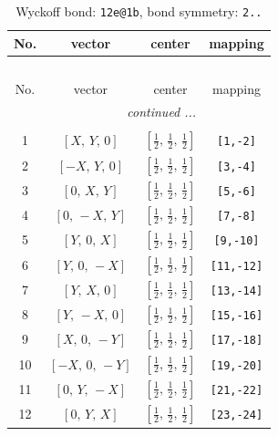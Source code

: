\documentclass[fleqn,8pt]{jsarticle}
\begin{document}
\renewcommand{\arraystretch}{1.2}
\begin{longtable}{cccc}
\caption{Wyckoff bond: {\tt 12e@1b}, bond symmetry: {\tt 2..}}
 \\
 \hline \hline
No. & vector & center & mapping \\ \hline \endfirsthead

\multicolumn{3}{l}{\tablename\ \thetable{}} \\
 \hline \hline
No. & vector & center & mapping \\ \hline \endhead

 \hline \hline
\multicolumn{3}{r}{\footnotesize\it continued ...} \\ \endfoot

 \hline \hline
\multicolumn{3}{r}{} \\ \endlastfoot

1 & $\left[ X,\, Y,\, 0 \right]$ & $\left[ \frac{1}{2},\, \frac{1}{2},\, \frac{1}{2} \right]$ & {\tt [1,-2]} \\ \hline
2 & $\left[ - X,\, Y,\, 0 \right]$ & $\left[ \frac{1}{2},\, \frac{1}{2},\, \frac{1}{2} \right]$ & {\tt [3,-4]} \\ \hline
3 & $\left[ 0,\, X,\, Y \right]$ & $\left[ \frac{1}{2},\, \frac{1}{2},\, \frac{1}{2} \right]$ & {\tt [5,-6]} \\ \hline
4 & $\left[ 0,\, - X,\, Y \right]$ & $\left[ \frac{1}{2},\, \frac{1}{2},\, \frac{1}{2} \right]$ & {\tt [7,-8]} \\ \hline
5 & $\left[ Y,\, 0,\, X \right]$ & $\left[ \frac{1}{2},\, \frac{1}{2},\, \frac{1}{2} \right]$ & {\tt [9,-10]} \\ \hline
6 & $\left[ Y,\, 0,\, - X \right]$ & $\left[ \frac{1}{2},\, \frac{1}{2},\, \frac{1}{2} \right]$ & {\tt [11,-12]} \\ \hline
7 & $\left[ Y,\, X,\, 0 \right]$ & $\left[ \frac{1}{2},\, \frac{1}{2},\, \frac{1}{2} \right]$ & {\tt [13,-14]} \\ \hline
8 & $\left[ Y,\, - X,\, 0 \right]$ & $\left[ \frac{1}{2},\, \frac{1}{2},\, \frac{1}{2} \right]$ & {\tt [15,-16]} \\ \hline
9 & $\left[ X,\, 0,\, - Y \right]$ & $\left[ \frac{1}{2},\, \frac{1}{2},\, \frac{1}{2} \right]$ & {\tt [17,-18]} \\ \hline
10 & $\left[ - X,\, 0,\, - Y \right]$ & $\left[ \frac{1}{2},\, \frac{1}{2},\, \frac{1}{2} \right]$ & {\tt [19,-20]} \\ \hline
11 & $\left[ 0,\, Y,\, - X \right]$ & $\left[ \frac{1}{2},\, \frac{1}{2},\, \frac{1}{2} \right]$ & {\tt [21,-22]} \\ \hline
12 & $\left[ 0,\, Y,\, X \right]$ & $\left[ \frac{1}{2},\, \frac{1}{2},\, \frac{1}{2} \right]$ & {\tt [23,-24]} \\
\end{longtable}
\end{document}
